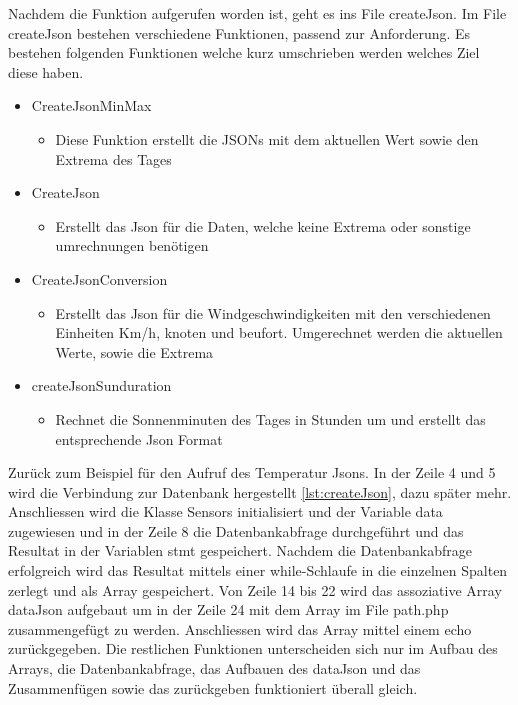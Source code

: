 Nachdem die Funktion aufgerufen worden ist, geht es ins File createJson. Im File createJson bestehen verschiedene Funktionen, passend zur Anforderung. Es bestehen folgenden Funktionen welche kurz umschrieben werden welches Ziel diese haben.\\
\begin{itemize}
\item CreateJsonMinMax
\begin{itemize}
\item Diese Funktion erstellt die JSONs mit dem aktuellen Wert sowie den Extrema des Tages
\end{itemize}
\item CreateJson
\begin{itemize}
\item Erstellt das Json für die Daten, welche keine Extrema oder sonstige umrechnungen benötigen
\end{itemize}
\item CreateJsonConversion
\begin{itemize}
\item Erstellt das Json für die Windgeschwindigkeiten mit den verschiedenen Einheiten Km/h, knoten und beufort. Umgerechnet werden die aktuellen Werte, sowie die Extrema
\end{itemize}
\item createJsonSunduration
\begin{itemize}
\item Rechnet die Sonnenminuten des Tages in Stunden um und erstellt das entsprechende Json Format
\end{itemize}
\end{itemize}

Zurück zum Beispiel für den Aufruf des Temperatur Jsons. In der Zeile 4 und 5 wird die Verbindung zur Datenbank hergestellt \ref{lst:createJson}, dazu später mehr. Anschliessen wird die Klasse Sensors initialisiert und der Variable data zugewiesen und in der Zeile 8 die Datenbankabfrage durchgeführt und das Resultat in der Variablen stmt gespeichert. Nachdem die Datenbankabfrage erfolgreich wird das Resultat mittels einer while-Schlaufe in die einzelnen Spalten zerlegt und als Array gespeichert. Von Zeile 14 bis 22 wird das assoziative Array dataJson aufgebaut um in der Zeile 24 mit dem Array im File path.php zusammengefügt zu werden. Anschliessen wird das Array mittel einem echo zurückgegeben. Die restlichen Funktionen unterscheiden sich nur im Aufbau des Arrays, die Datenbankabfrage, das Aufbauen des dataJson und das Zusammenfügen sowie das zurückgeben funktioniert überall gleich.

